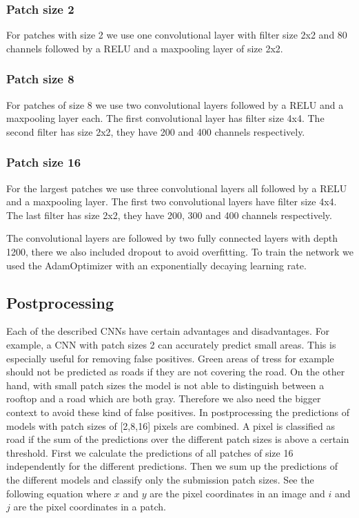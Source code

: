 \documentclass[10pt,conference,compsocconf]{IEEEtran}
\begin{document}
\subsubsection{Patch size 2}
	For patches with size 2 we use one convolutional layer with filter size 2x2 and 80 channels followed by a RELU and a maxpooling layer of size 2x2. 
\subsubsection{Patch size 8}
	For patches of size 8 we use two convolutional layers followed by a RELU and a maxpooling layer each. The first convolutional layer has filter size 4x4. The second filter has size 2x2, they have 200 and 400 channels respectively. 
\subsubsection{Patch size 16}
    For the largest patches we use three convolutional layers all followed by a RELU and a maxpooling layer. The first two convolutional layers have filter size 4x4. The last filter has size 2x2, they have 200, 300 and 400 channels respectively. 
    
The convolutional layers are followed by two fully connected layers with depth 1200, there we also included dropout to avoid overfitting. To train the network we used the AdamOptimizer \cite{adam} with an exponentially decaying learning rate.

    
\subsection{Postprocessing}
Each of the described CNNs have certain advantages and disadvantages. For example, a CNN with patch sizes 2 can accurately predict small areas. This is especially useful for removing false positives. Green areas of tress for example should not be predicted as roads if they are not covering the road. On the other hand, with small patch sizes the model is not able to distinguish between a rooftop and a road which are both gray. Therefore we also need the bigger context to avoid these kind of false positives. In postprocessing the predictions of models with patch sizes of [2,8,16] pixels are combined. A pixel is classified as road if the sum of the predictions over the different patch sizes is above a certain threshold.
First we calculate the predictions of all patches of size 16 independently for the different predictions. Then we sum up the predictions of the different models and classify only the submission patch sizes. See the following equation where $x$ and $y$ are the pixel coordinates in an image and $i$ and $j$ are the pixel coordinates in a patch.
\end{document}
